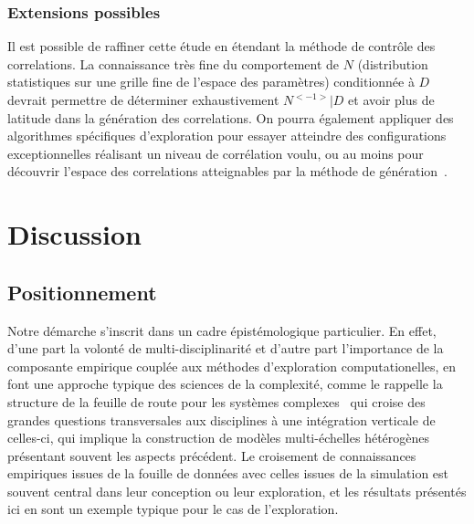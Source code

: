\subsubsection{Extensions possibles}

Il est possible de raffiner cette étude en étendant la méthode de contrôle des correlations. La connaissance très fine du comportement de $N$ (distribution statistiques sur une grille fine de l'espace des paramètres) conditionnée à $D$ devrait permettre de déterminer exhaustivement $N^{<-1>} | D$ et avoir plus de latitude dans la génération des correlations. On pourra également appliquer des algorithmes spécifiques d'exploration pour essayer atteindre des configurations exceptionnelles réalisant un niveau de corrélation voulu, ou au moins pour découvrir l'espace des correlations atteignables par la méthode de génération~\cite{10.1371/journal.pone.0138212}.





\section{Discussion}



\subsection*{Positionnement}


Notre démarche s'inscrit dans un cadre épistémologique particulier. En effet, d'une part la volonté de multi-disciplinarité et d'autre part l'importance de la composante empirique couplée aux méthodes d'exploration computationelles, en font une approche typique des sciences de la complexité, comme le rappelle la structure de la feuille de route pour les systèmes complexes~\cite{2009arXiv0907.2221B} qui croise des grandes questions transversales aux disciplines à une intégration verticale de celles-ci, qui implique la construction de modèles multi-échelles hétérogènes présentant souvent les aspects précédent. Le croisement de connaissances empiriques issues de la fouille de données avec celles issues de la simulation est souvent central dans leur conception ou leur exploration, et les résultats présentés ici en sont un exemple typique pour le cas de l'exploration.



